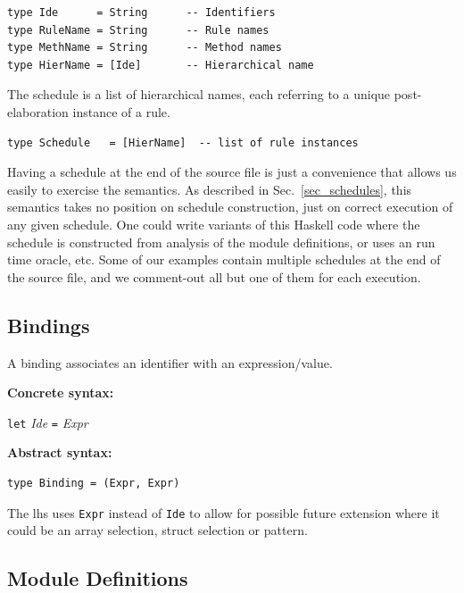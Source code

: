 \documentclass[11pt]{article}
\newcommand{\hm}{\hspace*{1em}}
\newcommand{\nterm}[1]{\emph{#1}}
\newcommand{\term}[1]{\texttt{#1}}
\newcommand{\gram}[2]{    \hm\makebox[10em][l]{\it #1}\makebox[1.5em][l]{::=}    #2}
\begin{document}
\begin{Verbatim}[frame=single, commandchars=\\\{\}]
type Ide      = String      -- Identifiers
type RuleName = String      -- Rule names
type MethName = String      -- Method names
type HierName = [Ide]       -- Hierarchical name
\end{Verbatim}

The schedule is a list of hierarchical names, each referring to a
unique post-elaboration instance of a rule.

\begin{Verbatim}[frame=single, commandchars=\\\{\}]
type Schedule   = [HierName]  -- list of rule instances
\end{Verbatim}

Having a schedule at the end of the source file is just a convenience
that allows us easily to exercise the semantics.  As described in
Sec.~\ref{sec_schedules}, this semantics takes no position on schedule
construction, just on correct execution of any given schedule.  One
could write variants of this Haskell code where the schedule is
constructed from analysis of the module definitions, or uses an run
time oracle, etc.  Some of our examples contain multiple schedules at
the end of the source file, and we comment-out all but one of them for
each execution.


\subsection{Bindings}

A binding associates an identifier with an expression/value.

{\bf Concrete syntax:}

\gram{Binding}{\term{let}  \nterm{Ide} \term{=}  \nterm{Expr}}

{\bf Abstract syntax:}

\begin{Verbatim}[frame=single, commandchars=\\\{\}]
type Binding = (Expr, Expr)
\end{Verbatim}

The lhs uses \term{Expr} instead of \term{Ide} to allow for possible
future extension where it could be an array selection, struct
selection or pattern.


\subsection{Module Definitions}
\end{document}
